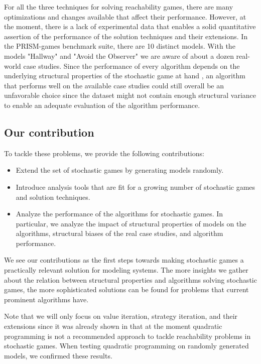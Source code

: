 For all the three techniques for solving reachability games, there are many optimizations and changes available that affect their performance.
However, at the moment, there is a lack of experimental data that enables a solid quantitative assertion of the performance of the solution techniques and their extensions.
In the PRISM-games benchmark suite, there are 10 distinct models. 
With the models "Hallway" and "Avoid the Observer" \cite{cav20} we are aware of about a dozen real-world case studies.
Since the performance of every algorithm depends on the underlying structural properties of the stochastic game at hand \cite{gandalf}, 
an algorithm that performs well on the available case studies could still overall be an unfavorable choice since the dataset might not contain enough
structural variance to enable an adequate evaluation of the algorithm performance.

\subsection*{Our contribution}
To tackle these problems, we provide the following contributions:
\begin{itemize}
    \item Extend the set of stochastic games by generating models randomly.
    \item Introduce analysis tools that are fit for a growing number of stochastic games and solution techniques.
    \item Analyze the performance of the algorithms for stochastic games. 
        In particular, we analyze the impact of structural properties of models on the algorithms, structural biases of the real case studies, and algorithm performance.
\end{itemize}

We see our contributions as the first steps towards making stochastic games a practically relevant solution for modeling systems. 
The more insights we gather about the relation between structural properties and algorithms solving stochastic games, the more sophisticated 
solutions can be found for problems that current prominent algorithms have. 

Note that we will only focus on value iteration, strategy iteration, and their extensions since it was already shown in \cite{gandalf} that at the moment
quadratic programming is not a recommended approach to tackle reachability problems in stochastic games.
When testing quadratic programming on randomly generated models, we confirmed these results.

